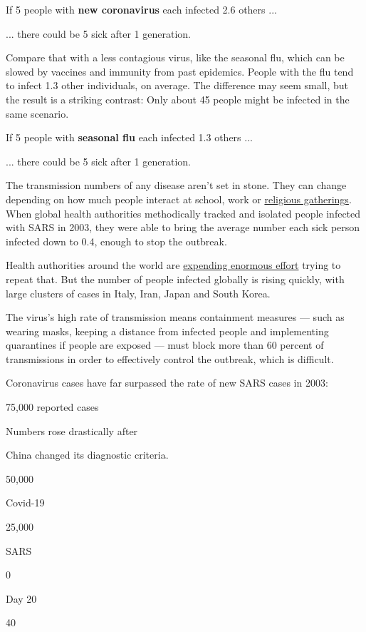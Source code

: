 If 5 people with \textbf{new coronavirus} each infected 2.6 others ...

... there could be 5 sick after 1 generation.

Compare that with a less contagious virus, like the seasonal flu, which
can be slowed by vaccines and immunity from past epidemics. People with
the flu tend to infect 1.3 other individuals, on average. The difference
may seem small, but the result is a striking contrast: Only about 45
people might be infected in the same scenario.

If 5 people with \textbf{seasonal flu} each infected 1.3 others ...

... there could be 5 sick after 1 generation.

The transmission numbers of any disease aren't set in stone. They can
change depending on how much people interact at school, work or
\href{https://www.nytimes.com/2020/02/21/world/asia/south-korea-coronavirus-shincheonji.html}{religious
gatherings}. When global health authorities methodically tracked and
isolated people infected with SARS in 2003, they were able to bring the
average number each sick person infected down to 0.4, enough to stop the
outbreak.

Health authorities around the world are
\href{https://www.nytimes.com/2020/01/29/health/china-coronavirus-outbreak.html}{expending
enormous effort} trying to repeat that. But the number of people
infected globally is rising quickly, with large clusters of cases in
Italy, Iran, Japan and South Korea.

The virus's high rate of transmission means containment measures ---
such as wearing masks, keeping a distance from infected people and
implementing quarantines if people are exposed --- must block more than
60 percent of transmissions in order to effectively control the
outbreak, which is difficult.

Coronavirus cases have far surpassed the rate of new SARS cases in 2003:

75,000 reported cases

Numbers rose drastically after

China changed its diagnostic criteria.

50,000

Covid-19

25,000

SARS

0

Day 20

40

